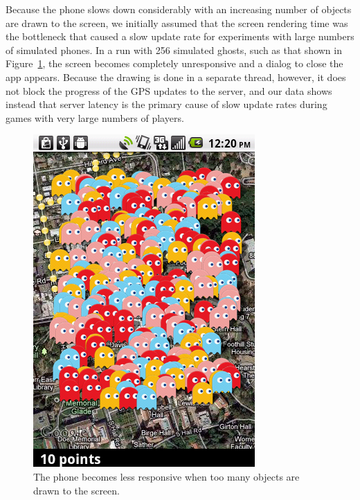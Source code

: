 \documentclass{acm_proc_article-sp}
\begin{document}
Because the phone slows down considerably with an increasing number of objects
are drawn to the screen, we initially assumed that the screen rendering time
was the bottleneck that caused a slow update rate for experiments with large
numbers of simulated phones. In a run with 256 simulated ghosts, such as that
shown in Figure~\ref{fig:256Ghosts}, the screen becomes completely unresponsive
and a dialog to close the app appears. Because the drawing is done in a
separate thread, however, it does not block the progress of the GPS updates to
the server, and our data shows instead that server latency is the primary cause
of slow update rates during games with very large numbers of players.

\begin{figure}
\centering
\includegraphics[scale=0.45]{screenshots/bigswarm}
\caption{The phone becomes less responsive when too many objects are drawn to the screen.}
\label{fig:256Ghosts}
\end{figure}
\end{document}
